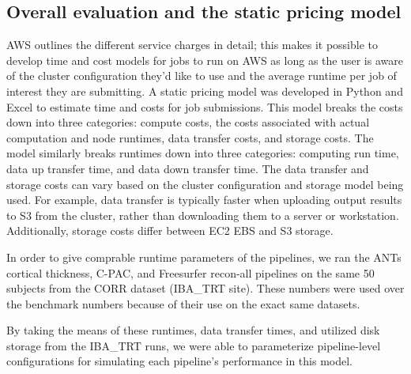 \documentclass{frontiersSCNS} %
\begin{document}
\subsection{Overall evaluation and the static pricing model}

AWS outlines the different service charges in detail; this makes it possible to develop time and cost models for jobs to run on AWS as long as the user is aware of the cluster configuration they’d like to use and the average runtime per job of interest they are submitting. A static pricing model was developed in Python and Excel to estimate time and costs for job submissions. This model breaks the costs down into three categories: compute costs, the costs associated with actual computation and node runtimes, data transfer costs, and storage costs. The model similarly breaks runtimes down into three categories: computing run time, data up transfer time, and data down transfer time. The data transfer and storage costs can vary based on the cluster configuration and storage model being used. For example, data transfer is typically faster when uploading output results to S3 from the cluster, rather than downloading them to a server or workstation. Additionally, storage costs differ between EC2 EBS and S3 storage.

In order to give comprable runtime parameters of the pipelines, we ran the ANTs cortical thickness, C-PAC, and Freesurfer recon-all pipelines on the same 50 subjects from the CORR dataset (IBA\_TRT site). These numbers were used over the benchmark numbers because of their use on the exact same datasets.

By taking the means of these runtimes, data transfer times, and utilized disk storage from the IBA\_TRT runs, we were able to parameterize pipeline-level configurations for simulating each pipeline's performance in this model.

\end{document}
